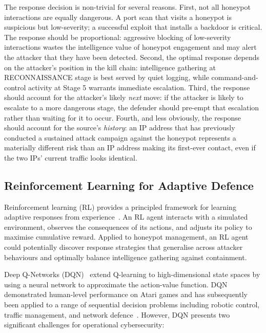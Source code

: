 The response decision is non-trivial for several reasons.
First, not all honeypot interactions are equally dangerous.
A port scan that visits a honeypot is suspicious but low-severity; a
successful exploit that installs a backdoor is critical.
The response should be proportional: aggressive blocking of low-severity
interactions wastes the intelligence value of honeypot engagement and
may alert the attacker that they have been detected.
Second, the optimal response depends on the attacker's position in the kill
chain: intelligence gathering at RECONNAISSANCE stage is best served by
quiet logging, while command-and-control activity at Stage 5 warrants
immediate escalation.
Third, the response should account for the attacker's likely \emph{next}
move: if the attacker is likely to escalate to a more dangerous stage,
the defender should pre-empt that escalation rather than waiting for it to
occur.
Fourth, and less obviously, the response should account for the source's
\emph{history}: an IP address that has previously conducted a sustained
attack campaign against the honeypot represents a materially different risk
than an IP address making its first-ever contact, even if the two IPs'
current traffic looks identical.

\subsection{Reinforcement Learning for Adaptive Defence}

Reinforcement learning (RL) provides a principled framework for learning
adaptive responses from experience~\citep{sutton2018reinforcement}.
An RL agent interacts with a simulated environment, observes the consequences
of its actions, and adjusts its policy to maximise cumulative reward.
Applied to honeypot management, an RL agent could potentially discover
response strategies that generalise across attacker behaviours and
optimally balance intelligence gathering against containment.

Deep Q-Networks (DQN)~\citep{mnih2015humanlevel} extend Q-learning to
high-dimensional state spaces by using a neural network to approximate
the action-value function.
DQN demonstrated human-level performance on Atari games and has subsequently
been applied to a range of sequential decision problems including robotic
control, traffic management, and network defence~\citep{elderman2017adversarial}.
However, DQN presents two significant challenges for operational cybersecurity:

